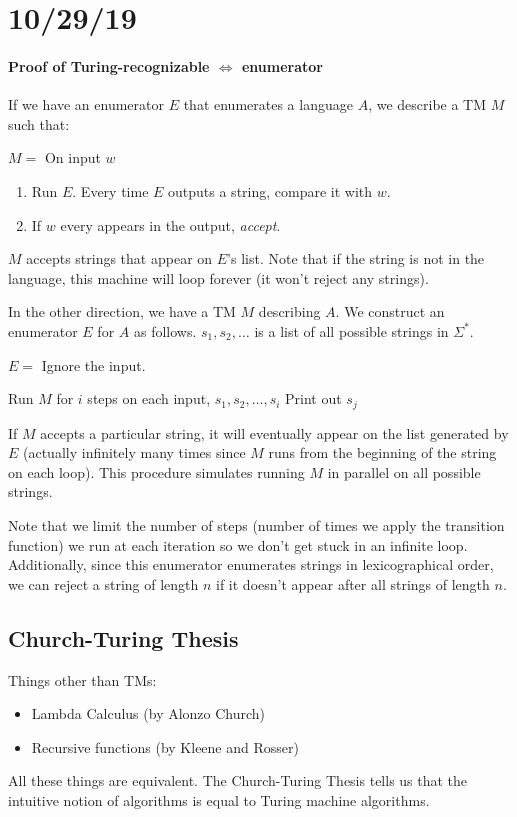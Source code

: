 \documentclass[12 pt]{article}
\begin{document}
\section{10/29/19}
\paragraph{Proof of Turing-recognizable $\iff$ enumerator}
If we have an enumerator $E$ that enumerates a language $A$, we
describe a TM $M$ such that:

$M = $ On input $w$
\begin{enumerate}
\item Run $E$. Every time $E$ outputs a string, compare it with $w$.
\item If $w$ every appears in the output, \textit{accept}.
\end{enumerate}
$M$ accepts strings that appear on $E$'s list. Note that if the string
is not in the language, this machine will loop forever (it won't
reject any strings).

In the other direction, we have a TM $M$ describing $A$. We construct
an enumerator $E$ for $A$ as follows. $s_1, s_2, \ldots$ is a list of
all possible strings in $\Sigma^*$.

$E = $ Ignore the input.
\begin{algorithmic}
    \State Run $M$ for $i$ steps on each input, $s_1,s_2, \ldots, s_i$
    \State Print out $s_j$
    \EndIf
  \EndFor
\end{algorithmic}
If $M$ accepts a particular string, it will eventually appear on the
list generated by $E$ (actually infinitely many times since $M$ runs
from the beginning of the string on each loop). This procedure
simulates running $M$ in parallel on all possible strings.

Note that we limit the number of steps (number of times we apply the
transition function) we run at each iteration so we
don't get stuck in an infinite loop. Additionally, since this
enumerator enumerates strings in lexicographical order, we can reject
a string of length $n$ if it doesn't appear after all strings of
length $n$.
\subsection{Church-Turing Thesis}
Things other than TMs:
\begin{itemize}
\item Lambda Calculus (by Alonzo Church)
\item Recursive functions (by Kleene and Rosser)
\end{itemize}
All these things are equivalent. The Church-Turing Thesis tells us
that the intuitive notion of algorithms is equal to Turing machine
algorithms.
\end{document}
